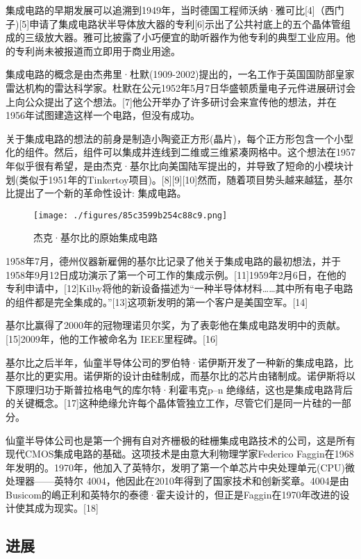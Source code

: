 集成电路的早期发展可以追溯到1949年，当时德国工程师沃纳·雅可比[4]（西门子)[5]申请了集成电路状半导体放大器的专利[6]示出了公共衬底上的五个晶体管组成的三级放大器。雅可比披露了小巧便宜的助听器作为他专利的典型工业应用。他的专利尚未被报道而立即用于商业用途。

集成电路的概念是由杰弗里·杜默(1909-2002)提出的，一名工作于英国国防部皇家雷达机构的雷达科学家。杜默在公元1952年5月7日华盛顿质量电子元件进展研讨会上向公众提出了这个想法。[7]他公开举办了许多研讨会来宣传他的想法，并在1956年试图建造这样一个电路，但没有成功。

关于集成电路的想法的前身是制造小陶瓷正方形(晶片)，每个正方形包含一个小型化的组件。然后，组件可以集成并连线到二维或三维紧凑网格中。这个想法在1957年似乎很有希望，是由杰克·基尔比向美国陆军提出的，并导致了短命的小模块计划(类似于1951年的Tinkertoy项目)。[8][9][10]然而，随着项目势头越来越猛，基尔比提出了一个新的革命性设计: 集成电路。

\begin{figure}[ht]
\centering
\texttt{[image: ./figures/85c3599b254c88c9.png]}
\caption{杰克·基尔比的原始集成电路} \label{fig_icJCDL_2}
\end{figure}

1958年7月，德州仪器新雇佣的基尔比记录了他关于集成电路的最初想法，并于1958年9月12日成功演示了第一个可工作的集成示例。[11]1959年2月6日，在他的专利申请中，[12]Kilby将他的新设备描述为“一种半导体材料……其中所有电子电路的组件都是完全集成的。”[13]这项新发明的第一个客户是美国空军。[14]

基尔比赢得了2000年的冠物理诺贝尔奖，为了表彰他在集成电路发明中的贡献。[15]2009年，他的工作被命名为 IEEE里程碑。[16]

基尔比之后半年，仙童半导体公司的罗伯特·诺伊斯开发了一种新的集成电路，比基尔比的更实用。诺伊斯的设计由硅制成，而基尔比的芯片由锗制成。诺伊斯将以下原理归功于斯普拉格电气的库尔特·利霍韦克p–n 绝缘结，这也是集成电路背后的关键概念。[17]这种绝缘允许每个晶体管独立工作，尽管它们是同一片硅的一部分。

仙童半导体公司也是第一个拥有自对齐栅极的硅栅集成电路技术的公司，这是所有现代CMOS集成电路的基础。这项技术是由意大利物理学家Federico Faggin在1968年发明的。1970年，他加入了英特尔，发明了第一个单芯片中央处理单元(CPU)微处理器——英特尔 4004，他因此在2010年得到了国家技术和创新奖章。4004是由Busicom的嶋正利和英特尔的泰德·霍夫设计的，但正是Faggin在1970年改进的设计使其成为现实。[18]

\subsection{进展}


